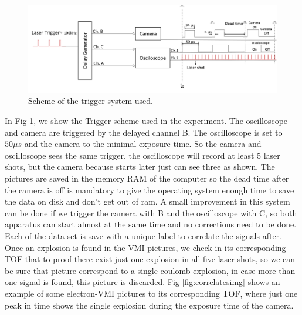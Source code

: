 \begin{figure}[h!]

\centering
\includegraphics[width = 14 cm]{../Images/Trigger scheme.png}
\caption[Trigger Scheme]{Scheme of the trigger system used.  }
\label{fig:triggers}
\end{figure}

In Fig \ref{fig:triggers}, we show the Trigger scheme used in the experiment. The oscilloscope and camera are triggered by the delayed channel B. The oscilloscope is set to $50\mu s$ and the camera to the minimal exposure time. So the camera and oscilloscope sees the same trigger, the oscilloscope will record at least 5 laser shots, but the camera because starts later just can see three as shown. The pictures are saved in the memory RAM of the computer so the dead time after the camera is off is mandatory to give the operating system enough time to save the data on disk and don't get out of ram. A small improvement in this system can be done if we trigger the camera with B and the oscilloscope with C, so both apparatus can start almost at the same time and no corrections need to be done. Each of the data set is save with a unique label to correlate the signals after. Once an explosion is found in the VMI pictures, we check in its corresponding TOF that to proof there exist just one explosion in all five laser shots, so we can be sure that picture correspond to a single coulomb explosion, in case more than one signal is found, this picture is discarded. Fig \ref{fig:correlatesimg} shows an example of some electron-VMI pictures to its corresponding TOF, where just one peak in time shows the single explosion during the exposure time of the camera.

